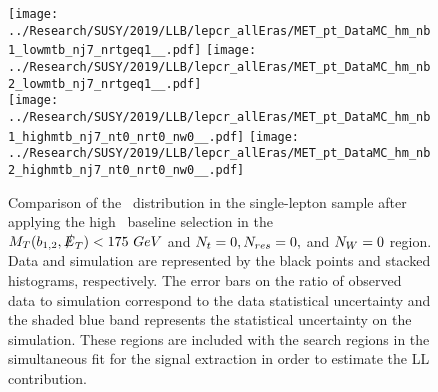 \begin{figure}[!htb]
	\begin{center}
  \texttt{[image: ../Research/SUSY/2019/LLB/lepcr\_allEras/MET\_pt\_DataMC\_hm\_nb1\_lowmtb\_nj7\_nrtgeq1\_\_.pdf]}
  \texttt{[image: ../Research/SUSY/2019/LLB/lepcr\_allEras/MET\_pt\_DataMC\_hm\_nb2\_lowmtb\_nj7\_nrtgeq1\_\_.pdf]} \\
  \texttt{[image: ../Research/SUSY/2019/LLB/lepcr\_allEras/MET\_pt\_DataMC\_hm\_nb1\_highmtb\_nj7\_nt0\_nrt0\_nw0\_\_.pdf]}
  \texttt{[image: ../Research/SUSY/2019/LLB/lepcr\_allEras/MET\_pt\_DataMC\_hm\_nb2\_highmtb\_nj7\_nt0\_nrt0\_nw0\_\_.pdf]} \\
	\end{center}
	\caption[Lost Lepton HM Control Region]{Comparison of the \met~distribution in the single-lepton sample after applying the high \dm~baseline selection in the $M_{T}(b_{1,2},\slashed{E}_{T})<175~GeV$ and $N_{t}=0, N_{res}=0,$ and $N_{W}=0$ region. Data and simulation are represented by the black points and stacked histograms, respectively. The error bars on the ratio of observed data to simulation correspond to the data statistical uncertainty and the shaded blue band represents the statistical uncertainty on the simulation. These regions are included with the search regions in the simultaneous fit for the signal extraction in order to estimate the LL contribution.
	 }
	\label{fig:llb-1lcr-datavsmc-hm-nt0-nrt0-nw0}
\end{figure}

